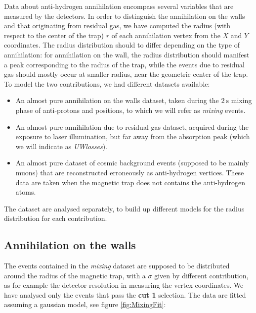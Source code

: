 \documentclass[11pt,a4paper,twocolumn]{article}
\begin{document}
Data about anti-hydrogen annihilation encompass several variables that are measured by the detectors. In order to distinguish the annihilation on the walls and that originating from residual gas, we have computed the radius (with respect to the center of the trap) $r$ of each annihilation vertex from the $X$ and $Y$ coordinates.
The radius distribution should to differ depending on the type of annihilation: for annihilation on the wall, the radius distribution should manifest a peak corresponding to the radius of the trap, while the events due to residual gas should mostly occur at smaller radius, near the geometric center of the trap.
To model the two contributions, we had different datasets available: 
\begin{itemize}
\item An almost pure annihilation on the walls dataset, taken during the $\SI{2}{\second}$ mixing phase of anti-protons and positions, to which we will refer as \textit{mixing} events.
\item An almost pure annihilation due to residual gas dataset, acquired during the exposure to laser illumination, but far away from the absorption peak (which we will indicate as \textit{UWlosses}).
\item An almost pure dataset of cosmic background events (supposed to be mainly muons) that are reconstructed erroneously as anti-hydrogen vertices. These data are taken when the magnetic trap does not contains the anti-hydrogen atoms.
\end{itemize}

The dataset are analysed separately, to build up different models for the radius distribution for each contribution.

\subsection*{Annihilation on the walls}

The events contained in the \textit{mixing} dataset are supposed to be distributed around the radius of the magnetic trap, with a $\sigma$ given by different contribution, as for example the detector resolution in measuring the vertex coordinates. We have analysed only the events that pass the \textbf{cut 1} selection. The data are fitted assuming a gaussian model, see figure \ref{fig:MixingFit}:
\end{document}
